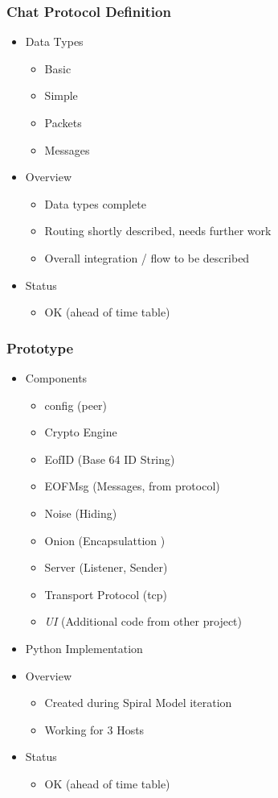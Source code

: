 \documentclass{beamer}
\begin{document}
\frame
{
  \frametitle{Chat Protocol Definition}
  \begin{itemize}
      \item Data Types 
      \begin{itemize}
          \item Basic
          \item Simple
          \item Packets
          \item Messages
      \end{itemize}
      \item Overview
      \begin{itemize}
          \item Data types complete
          \item Routing shortly described, needs further work
          \item Overall integration / flow to be described
      \end{itemize}
      \item Status
      \begin{itemize}
          \item OK (ahead of time table)
      \end{itemize}
  \end{itemize}
}

\frame
{
  \frametitle{Prototype}
  \begin{itemize}
      \item Components
      \begin{itemize}
          \item config (peer)
          \item Crypto Engine
          \item EofID (Base 64 ID String)
          \item EOFMsg (Messages, from protocol)
          \item Noise (Hiding)
          \item Onion (Encapsulattion )
          \item Server (Listener, Sender)
          \item Transport Protocol (tcp)
          \item \textit{UI} (Additional code from other project)
      \end{itemize}
      \item Python Implementation
      \item Overview
      \begin{itemize}
          \item Created during Spiral Model iteration
          \item Working for 3 Hosts
      \end{itemize}
      \item Status
      \begin{itemize}
          \item OK (ahead of time table)
      \end{itemize}
  \end{itemize}
}
\end{document}
